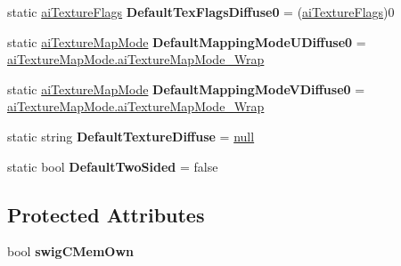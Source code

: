 \begin{DoxyCompactItemize}
\item 
\hypertarget{classai_material_a8e2d7a6021ac46e48ba7f979beaa4d4c}{static \hyperlink{material_8h_a6d003e078617e4e80d1313a6250b2dfd}{ai\+Texture\+Flags} {\bfseries Default\+Tex\+Flags\+Diffuse0} = (\hyperlink{material_8h_a6d003e078617e4e80d1313a6250b2dfd}{ai\+Texture\+Flags})0}\label{classai_material_a8e2d7a6021ac46e48ba7f979beaa4d4c}

\item 
\hypertarget{classai_material_aa30f237dc7662bd09c35cf0cc336e3fe}{static \hyperlink{material_8h_a6cbe56056751aa80e8dd714632a49de0}{ai\+Texture\+Map\+Mode} {\bfseries Default\+Mapping\+Mode\+U\+Diffuse0} = \hyperlink{material_8h_a6cbe56056751aa80e8dd714632a49de0a39bee4a4d7222d7f21fc093cacac2bcf}{ai\+Texture\+Map\+Mode.\+ai\+Texture\+Map\+Mode\+\_\+\+Wrap}}\label{classai_material_aa30f237dc7662bd09c35cf0cc336e3fe}

\item 
\hypertarget{classai_material_ad4266b03d9b4b5936e6575ff888c0057}{static \hyperlink{material_8h_a6cbe56056751aa80e8dd714632a49de0}{ai\+Texture\+Map\+Mode} {\bfseries Default\+Mapping\+Mode\+V\+Diffuse0} = \hyperlink{material_8h_a6cbe56056751aa80e8dd714632a49de0a39bee4a4d7222d7f21fc093cacac2bcf}{ai\+Texture\+Map\+Mode.\+ai\+Texture\+Map\+Mode\+\_\+\+Wrap}}\label{classai_material_ad4266b03d9b4b5936e6575ff888c0057}

\item 
\hypertarget{classai_material_a5ee5458a75454e57a5485773165e74ca}{static string {\bfseries Default\+Texture\+Diffuse} = \hyperlink{_ice_types_8h_ac97b8ee753e4405397a42ad5799b0f9e}{null}}\label{classai_material_a5ee5458a75454e57a5485773165e74ca}

\item 
\hypertarget{classai_material_a8ee723a59f17d0f858d3c2dd7f527a7f}{static bool {\bfseries Default\+Two\+Sided} = false}\label{classai_material_a8ee723a59f17d0f858d3c2dd7f527a7f}

\end{DoxyCompactItemize}
\subsection*{Protected Attributes}
\begin{DoxyCompactItemize}
\item 
\hypertarget{classai_material_aea64fa444494155e5502c369a30f0f31}{bool {\bfseries swig\+C\+Mem\+Own}}\label{classai_material_aea64fa444494155e5502c369a30f0f31}

\end{DoxyCompactItemize}

